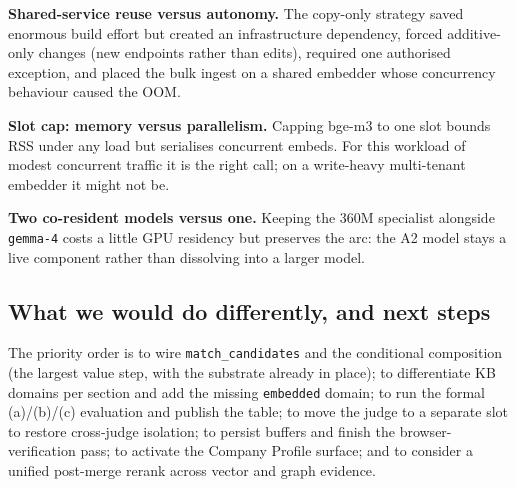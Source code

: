 \textbf{Shared-service reuse versus autonomy.} The copy-only strategy saved enormous build
effort but created an infrastructure dependency, forced additive-only changes (new endpoints
rather than edits), required one authorised exception, and placed the bulk ingest on a
shared embedder whose concurrency behaviour caused the OOM.

\textbf{Slot cap: memory versus parallelism.} Capping bge-m3 to one slot bounds RSS under
any load but serialises concurrent embeds. For this workload of modest concurrent traffic
it is the right call; on a write-heavy multi-tenant embedder it might not be.

\textbf{Two co-resident models versus one.} Keeping the 360M specialist alongside
\verb|gemma-4| costs a little GPU residency but preserves the arc: the A2 model stays a live
component rather than dissolving into a larger model.

\subsection{What we would do differently, and next steps}

The priority order is to wire \verb|match_candidates| and the conditional composition (the
largest value step, with the substrate already in place); to differentiate KB domains per
section and add the missing \texttt{embedded} domain; to run the formal (a)/(b)/(c)
evaluation and publish the table; to move the judge to a separate slot to restore
cross-judge isolation; to persist buffers and finish the browser-verification pass; to
activate the Company Profile surface; and to consider a unified post-merge rerank across
vector and graph evidence.
